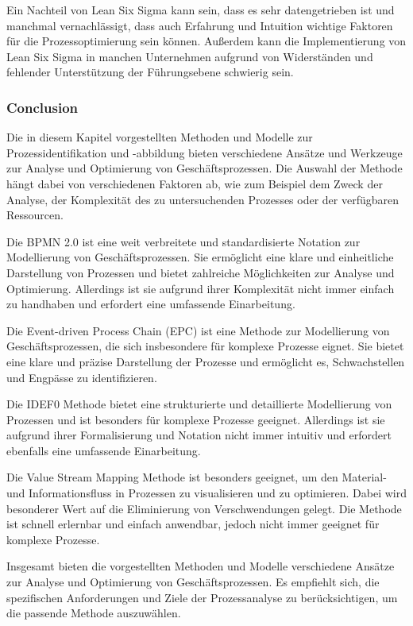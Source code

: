 \documentclass[11pt,a4paper]{scrartcl}
\begin{document}
Ein Nachteil von Lean Six Sigma kann sein, dass es sehr datengetrieben ist und manchmal vernachlässigt, dass auch Erfahrung und Intuition wichtige Faktoren für die Prozessoptimierung sein können.
Außerdem kann die Implementierung von Lean Six Sigma in manchen Unternehmen aufgrund von Widerständen und fehlender Unterstützung der Führungsebene schwierig sein.\\

\subsubsection{Conclusion}

Die in diesem Kapitel vorgestellten Methoden und Modelle zur Prozessidentifikation und -abbildung bieten verschiedene Ansätze und Werkzeuge zur Analyse und Optimierung von Geschäftsprozessen. Die Auswahl der Methode hängt dabei von verschiedenen Faktoren ab, wie zum Beispiel dem Zweck der Analyse, der Komplexität des zu untersuchenden Prozesses oder der verfügbaren Ressourcen.

Die BPMN 2.0 ist eine weit verbreitete und standardisierte Notation zur Modellierung von Geschäftsprozessen. Sie ermöglicht eine klare und einheitliche Darstellung von Prozessen und bietet zahlreiche Möglichkeiten zur Analyse und Optimierung. Allerdings ist sie aufgrund ihrer Komplexität nicht immer einfach zu handhaben und erfordert eine umfassende Einarbeitung.

Die Event-driven Process Chain (EPC) ist eine Methode zur Modellierung von Geschäftsprozessen, die sich insbesondere für komplexe Prozesse eignet. Sie bietet eine klare und präzise Darstellung der Prozesse und ermöglicht es, Schwachstellen und Engpässe zu identifizieren.

Die IDEF0 Methode bietet eine strukturierte und detaillierte Modellierung von Prozessen und ist besonders für komplexe Prozesse geeignet. Allerdings ist sie aufgrund ihrer Formalisierung und Notation nicht immer intuitiv und erfordert ebenfalls eine umfassende Einarbeitung.

Die Value Stream Mapping Methode ist besonders geeignet, um den Material- und Informationsfluss in Prozessen zu visualisieren und zu optimieren. Dabei wird besonderer Wert auf die Eliminierung von Verschwendungen gelegt. Die Methode ist schnell erlernbar und einfach anwendbar, jedoch nicht immer geeignet für komplexe Prozesse.

Insgesamt bieten die vorgestellten Methoden und Modelle verschiedene Ansätze zur Analyse und Optimierung von Geschäftsprozessen. Es empfiehlt sich, die spezifischen Anforderungen und Ziele der Prozessanalyse zu berücksichtigen, um die passende Methode auszuwählen.
\end{document}
